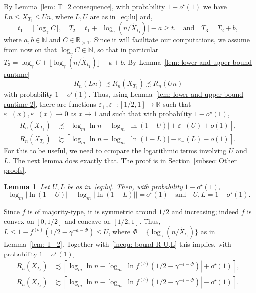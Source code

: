 \documentclass[11pt]{article}
\numberwithin{theorem}{section}
\newtheorem{lemma}[theorem]{Lemma}
\begin{document}
By Lemma~\ref{lem: T_2 consequence}, with probability $1-o^\star(1)$ we have $Ln\leq X_{T_3}\leq Un$, where $L,U$ are as in~\eqref{eq:lu} and,
\[
    t_1 = \lfloor \log_\gamma C \rfloor,
    \quad
    T_2 = t_1 + \lfloor \log_\gamma(n/\tilde{X}_{t_1}) \rfloor - a \ge t_1
    \quad
    \text{and}
    \quad
    T_3 = T_2 + b,
\]
where $a,b\in\mathbb{N}$ and $C \in\mathbb{R}_{>1}$. Since it will facilitate our computations, we assume from now on that $\log_\gamma C\in\mathbb{N}$, so that in particular $T_3= \log_\gamma C+\lfloor \log_\gamma(n/\tilde X_{t_1})\rfloor-a+b$. By Lemma~\ref{lem: lower and upper bound runtime}
\[
    R_n(Ln)\precsim R_n(X_{T_3}) \precsim R_n(Un)
\]
with probability $1-o^\star(1)$. Thus, using Lemma~\ref{lem: lower and upper bound runtime 2}, there are functions $\varepsilon_+,\varepsilon_-:[1/2,1] \to \mathbb{R}$ such that $\varepsilon_+(x), \varepsilon_-(x) \to 0$ as $x \to 1$ and such that with probability $1-o^\star(1)$,
\begin{equation}
\begin{aligned}
    R_n(X_{T_3}) &\precsim\left\lceil \log_m\ln n -\log_m|\ln (1-U)|+\varepsilon_+(U)+o(1) \right\rceil, \\
    R_n(X_{T_3}) &\succsim \left\lceil \log_m\ln n-\log_m|\ln (1-L)|-\varepsilon_-(L) - o(1) \right\rceil.
\end{aligned}
\label{inequ: bound R U,L}
\end{equation}
For this to be useful, we need to compare the logarithmic terms involving $U$ and $L$. The next lemma does exactly that. The proof is in Section~\ref{subsec: Other proofs}.
\begin{lemma}\label{lem: l and u close}
Let $U,L$ be as in~\eqref{eq:lu}. Then, with probability $1-o^\star(1)$, 
\begin{equation*}
     \Big|\log_m|\ln(1-U)|-\log_m|\ln(1-L)|\Bigr| =o^\star(1) \quad \text{and} \quad U,L= 1-o^\star(1).
\end{equation*}
\end{lemma}
Since $f$ is of majority-type, it is symmetric around $1/2$ and increasing; indeed $f$ is convex on $[0,1/2]$ and concave on $[1/2,1]$.
Thus, $L \leq 1-f^{(b)}(1/2-\gamma^{-a-\Phi})\leq  U$, where $\Phi =  \{\log_\gamma(n/\tilde X_{t_1})\}$ as in Lemma~\ref{lem: T_2}.
Together with~\eqref{inequ: bound R U,L} this implies, with probability $1-o^\star(1)$,
\begin{align*}
    R_n(X_{T_3}) &\precsim\left\lceil \log_m\ln n-\log_m|\ln f^{(b)}(1/2-\gamma^{-a-\Phi})|+o^\star(1) \right\rceil, \\
    R_n(X_{T_3}) &\succsim \left\lceil \log_m\ln n-\log_m|\ln f^{(b)}(1/2-\gamma^{-a-\Phi})|-o^\star(1) \right\rceil.    
\end{align*}
\end{document}
